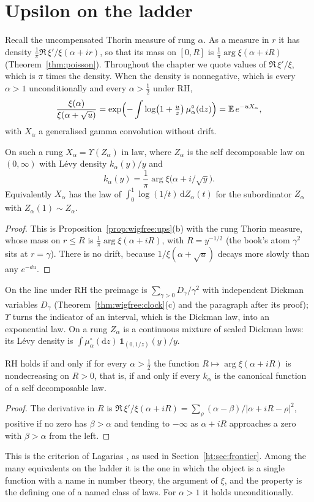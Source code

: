 \section{Upsilon on the ladder}\label{bn:sec:ups}
Recall the uncompensated Thorin measure of rung $\alpha$. As a measure in $r$ it has density $\frac1\pi\Re\,\xi'/\xi(\alpha+ir)$, so that its mass on $[0,R]$ is $\frac1\pi\arg\xi(\alpha+iR)$ (Theorem~\ref{thm:poisson}). Throughout the chapter we quote values of $\Re\,\xi'/\xi$, which is $\pi$ times the density. When the density is nonnegative, which is every $\alpha>1$ unconditionally and every $\alpha>\frac12$ under RH,
\[
\frac{\xi(\alpha)}{\xi(\alpha+\sqrt u)}=\exp\Bigl(-\int\log\bigl(1+\tfrac uz\bigr)\,\mu^\circ_\alpha(\mathrm dz)\Bigr)=\mathbb E\,e^{-uX_\alpha},
\]
with $X_\alpha$ a generalised gamma convolution without drift.
\begin{proposition}\label{bn:prop:ups}
On such a rung $X_\alpha=\Upsilon(Z_\alpha)$ in law, where $Z_\alpha$ is the self decomposable law on $(0,\infty)$ with L\'evy density $k_\alpha(y)/y$ and
\[
k_\alpha(y)=\frac1\pi\arg\xi\bigl(\alpha+i/\sqrt y\bigr).
\]
Equivalently $X_\alpha$ has the law of $\int_0^1\log(1/t)\,\mathrm dZ_\alpha(t)$ for the subordinator $Z_\alpha$ with $Z_\alpha(1)\sim Z_\alpha$.
\end{proposition}
\begin{proof}
This is Proposition~\ref{prop:wigfree:ups}(b) with the rung Thorin measure, whose mass on $r\le R$ is $\frac1\pi\arg\xi(\alpha+iR)$, with $R=y^{-1/2}$ (the book's atom $\gamma^2$ sits at $r=\gamma$). There is no drift, because $1/\xi(\alpha+\sqrt u)$ decays more slowly than any $e^{-du}$.
\end{proof}
On the line under RH the preimage is $\sum_{\gamma>0}D_\gamma/\gamma^2$ with independent Dickman variables $D_\gamma$ (Theorem~\ref{thm:wigfree:clock}(c) and the paragraph after its proof); $\Upsilon$ turns the indicator of an interval, which is the Dickman law, into an exponential law. On a rung $Z_\alpha$ is a continuous mixture of scaled Dickman laws: its L\'evy density is $\int\mu^\circ_\alpha(\mathrm dz)\,\mathbf 1_{(0,1/z)}(y)/y$.
\begin{corollary}\label{bn:cor:mono}
RH holds if and only if for every $\alpha>\frac12$ the function $R\mapsto\arg\xi(\alpha+iR)$ is nondecreasing on $R>0$, that is, if and only if every $k_\alpha$ is the canonical function of a self decomposable law.
\end{corollary}
\begin{proof}
The derivative in $R$ is $\Re\,\xi'/\xi(\alpha+iR)=\sum_\rho(\alpha-\beta)/|\alpha+iR-\rho|^2$, positive if no zero has $\beta>\alpha$ and tending to $-\infty$ as $\alpha+iR$ approaches a zero with $\beta>\alpha$ from the left.
\end{proof}
This is the criterion of Lagarias \cite{Lagarias}, as used in Section~\ref{ht:sec:frontier}. Among the many equivalents on the ladder it is the one in which the object is a single function with a name in number theory, the argument of $\xi$, and the property is the defining one of a named class of laws. For $\alpha>1$ it holds unconditionally.

